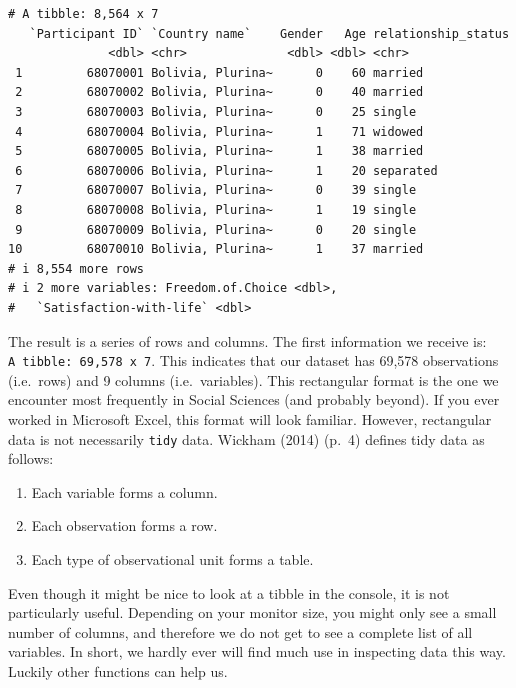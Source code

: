 \documentclass[
  letterpaper,
]{krantz}
\providecommand{\tightlist}{%
  \setlength{\itemsep}{0pt}\setlength{\parskip}{0pt}}\usepackage{longtable,booktabs,array}
\renewenvironment{quote}{\begin{VF}}{\end{VF}}
\begin{document}
\begin{verbatim}
# A tibble: 8,564 x 7
   `Participant ID` `Country name`    Gender   Age relationship_status
              <dbl> <chr>              <dbl> <dbl> <chr>              
 1         68070001 Bolivia, Plurina~      0    60 married            
 2         68070002 Bolivia, Plurina~      0    40 married            
 3         68070003 Bolivia, Plurina~      0    25 single             
 4         68070004 Bolivia, Plurina~      1    71 widowed            
 5         68070005 Bolivia, Plurina~      1    38 married            
 6         68070006 Bolivia, Plurina~      1    20 separated          
 7         68070007 Bolivia, Plurina~      0    39 single             
 8         68070008 Bolivia, Plurina~      1    19 single             
 9         68070009 Bolivia, Plurina~      0    20 single             
10         68070010 Bolivia, Plurina~      1    37 married            
# i 8,554 more rows
# i 2 more variables: Freedom.of.Choice <dbl>,
#   `Satisfaction-with-life` <dbl>
\end{verbatim}

The result is a series of rows and columns. The first information we
receive is: \texttt{A\ tibble:\ 69,578\ x\ 7}. This indicates that our
dataset has 69,578 observations (i.e.~rows) and 9 columns
(i.e.~variables). This rectangular format is the one we encounter most
frequently in Social Sciences (and probably beyond). If you ever worked
in Microsoft Excel, this format will look familiar. However, rectangular
data is not necessarily \texttt{tidy} data. Wickham (2014) (p.~4)
defines tidy data as follows:

\begin{quote}
\begin{enumerate}
\def\labelenumi{\arabic{enumi}.}
\tightlist
\item
  Each variable forms a column.
\item
  Each observation forms a row.
\item
  Each type of observational unit forms a table.
\end{enumerate}
\end{quote}

Even though it might be nice to look at a tibble in the console, it is
not particularly useful. Depending on your monitor size, you might only
see a small number of columns, and therefore we do not get to see a
complete list of all variables. In short, we hardly ever will find much
use in inspecting data this way. Luckily other functions can help us.
\end{document}
